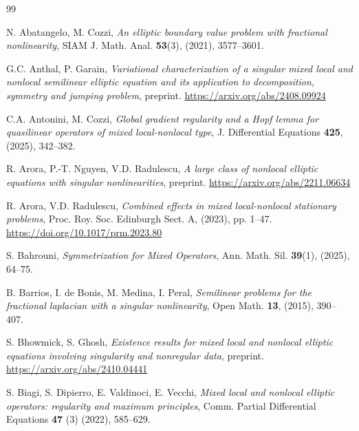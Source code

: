 \documentclass[11pt,a4paper]{amsart}
\theoremstyle{definition}
\theoremstyle{plain}
\numberwithin{equation}{section}
\begin{document}
{  
  

 \begin{thebibliography}{99}
 
N. Abatangelo, M. Cozzi,
{\em An elliptic boundary value problem with fractional nonlinearity},
SIAM J. Math. Anal. {\bf 53}(3), (2021), 3577--3601. 

G.C. Anthal, P. Garain,
{\em Variational characterization of a singular mixed local and nonlocal semilinear elliptic equation and its application to decomposition, symmetry and jumping problem},
preprint. \url{https://arxiv.org/abs/2408.09924}

C.A. Antonini, M. Cozzi,
{\em Global gradient regularity and a Hopf lemma for quasilinear operators of mixed local-nonlocal type},
J. Differential Equations {\bf 425}, (2025), 342--382. 

R. Arora, P.-T. Nguyen, V.D. Radulescu,
{\em A large class of nonlocal elliptic equations with singular nonlinearities},
preprint. \url{https://arxiv.org/abs/2211.06634}

 
R. Arora, V.D. Radulescu,
\emph{Combined effects in mixed local-nonlocal stationary problems}, 
Proc. Roy. Soc. Edinburgh Sect. A, (2023), pp. 1--47. \url{https://doi.org/10.1017/prm.2023.80}

S. Bahrouni,
{\em Symmetrization for Mixed Operators},
Ann. Math. Sil. {\bf 39}(1), (2025), 64--75.

B. Barrios, I. de Bonis, M. Medina, I. Peral, 
{\em Semilinear problems for the fractional laplacian with a singular nonlinearity}, 
Open Math. {\bf 13}, (2015), 390--407.


S. Bhowmick, S. Ghosh,
{\em Existence results for mixed local and nonlocal elliptic equations involving singularity and nonregular data},
preprint. \url{https://arxiv.org/abs/2410.04441}

S. Biagi, S. Dipierro, E. Valdinoci, E. Vecchi,
{\em Mixed local and nonlocal elliptic operators: regularity and maximum principles}, 
Comm. Partial Differential Equations {\bf 47} (3) (2022), 585--629.


 

\end{thebibliography}}
\end{document}
